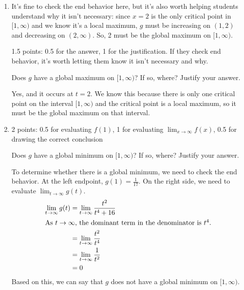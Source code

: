 \documentclass{article}
\begin{document}
\begin{enumerate}
\begin{enumerate}
  \item

    \begin{workshop}
      It's fine to check the end behavior here, but it's also worth helping students understand why it isn't necessary: since $x = 2$ is the only critical point in $[1, \infty)$ and we know it's a local maximum, $g$ must be increasing on $(1, 2)$ and decreasing on $(2, \infty)$. So, 2 must be the global maximum on $[1, \infty)$.
    \end{workshop}

    \begin{grading}
      1.5 points: 0.5 for the answer, 1 for the justification. If they check end behavior, it's worth letting them know it isn't necessary and why. 
    \end{grading}

    \begin{problem}[\vfill\newpage]
      Does $g$ have a global maximum on $[1, \infty)$? If so, where? Justify your answer. 
    \end{problem}

    \begin{solution}
      Yes, and it occurs at $t=2$. We know this because there is only one critical
      point on the interval $[1, \infty)$ and the critical point is a local maximum,
      so it must be the global maximum on that interval.
    \end{solution}

  \item

    \begin{grading}
      2 points: 0.5 for evaluating $f(1)$, 1 for evaluating $\displaystyle \lim_{x \to \infty} f(x)$, 0.5 for drawing the correct conclusion 
    \end{grading}

    \begin{problem}[\vfill]
      Does $g$ have a global minimum on $[1, \infty)$? If so, where? Justify your answer. 
    \end{problem}

    \begin{solution}
      To determine whether there is a global minimum, we need to check the end behavior.
      At the left endpoint, $g(1)=\frac{1}{17}$. On the right side, we need to evaluate
      $\lim_{t \to \infty} g(t)$.
      \begin{align*}
        \lim_{t \to \infty} g(t) &= \lim_{t \to \infty} \frac{t^2}{t^4+16} \\
        \intertext{As $t\to\infty$, the dominant term in the denominator is $t^4$.}
        &= \lim_{t \to \infty} \frac{t^2}{t^4} \\
        &= \lim_{t \to \infty} \frac{1}{t^2} \\
        &= 0
      \end{align*}
      Based on this, we can say that $g$ does not have a global minimum on $[1, \infty)$.
    \end{solution}


\end{enumerate}
\end{enumerate}
\end{document}
